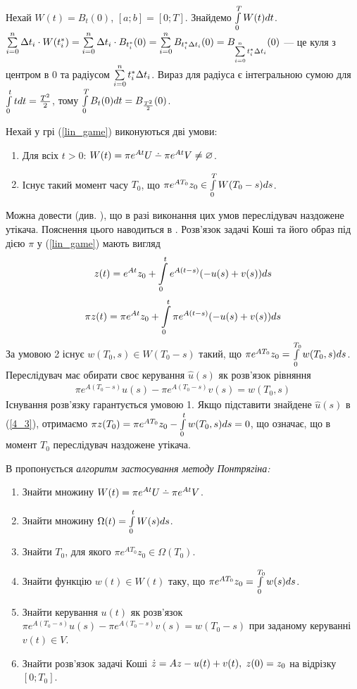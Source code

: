 \begin{example}\label{ball_intergral}
    Нехай $W(t) = B_t(0)$, $[a;b] = [0; T]$. Знайдемо 
    $\int\limits_0^T W(t) dt$.
    $\sum\limits_{i=0}^n \Delta t_i\cdot W(t_i^*) = \sum\limits_{i=0}^n \Delta t_i\cdot B_{t_i^*}(0) = 
    \sum\limits_{i=0}^n B_{t_i^* \Delta t_i}(0) = B_{\sum\limits_{i=0}^n t_i^* \Delta t_i} (0)$ --- це
    куля з центром в $0$ та радіусом $\sum\limits_{i=0}^n t_i^* \Delta t_i$. Вираз для радіуса
    є інтегральною сумою для $\int\limits_0^t t dt = \frac{T^2}{2}$, тому
    $\int\limits_0^T B_t(0) dt = B_{\frac{T^2}{2}} (0)$.
\end{example}
Нехай у грі (\ref{lin_game}) виконуються дві умови:
\begin{enumerate}
    \item Для всіх $t>0$: $W(t) = \pi e^{At}U \setdif \pi e^{At}V \neq \varnothing$.
    \item Існує такий момент часу $T_0$, що $\pi e^{AT_0}z_0 \in \int\limits_0^T W(T_0 - s)ds$.
\end{enumerate}

Можна довести (див. \cite{4}), що в разі виконання цих умов переслідувач наздожене утікача.
Пояснення цього наводиться в \cite{3}. Розв'язок задачі Коші та його образ під дією $\pi$ у (\ref{lin_game}) мають вигляд
\begin{gather}
    z(t) = e^{A t} z_0 + \int\limits_0^t e^{A(t-s)} (- u(s) + v(s)) ds
\end{gather}
\begin{gather}\label{4_3}
    \pi z(t) =  \pi e^{A t} z_0 + \int\limits_0^t \pi e^{A(t-s)} (- u(s) + v(s)) ds
\end{gather}
За умовою 2 існує $w(T_0, s) \in W(T_0-s)$ такий, що $\pi e^{AT_0}z_0 = \int\limits_0^{T_0} w(T_0, s) ds$. Переслідувач має обирати своє керування
$\widehat{u}(s)$ як розв'язок рівняння
\begin{gather*}
    \pi e^{A (T_0-s)} u(s) - \pi e^{A (T_0-s)} v(s) = w(T_0, s) 
\end{gather*}
Існування розв'язку гарантується умовою 1. Якщо підставити знайдене $\widehat{u}(s)$ в (\ref{4_3}),
отримаємо 
$
    \pi z(T_0) = \pi e^{A T_0} z_0 - \int\limits_0^t w(T_0, s) ds = 0
$, що означає, що в момент $T_0$ переслідувач наздожене утікача.

В \cite{3} пропонується \emph{алгоритм застосування методу Понтрягіна:}
\begin{enumerate}
    \item Знайти множину $W(t) = \pi e^{At}U \setdif \pi e^{At}V$.
    \item Знайти множину $\Omega(t) = \int\limits_0^t W(s)ds$.
    \item Знайти $T_0$, для якого $\pi e^{A T_0} z_0 \in \Omega(T_0)$.
    \item Знайти функцію $w(t) \in W(t)$ таку, що $\pi e^{A T_0} z_0 = \int\limits_0^{T_0} w(s) ds$.
    \item Знайти керування $u(t)$ як розв'язок $\pi e^{A (T_0-s)} u(s) - \pi e^{A (T_0-s)} v(s) = w(T_0 - s) $ при заданому керуванні $v(t) \in V$.
    \item Знайти розв'язок задачі Коші $\dot{z} = Az - u(t) + v(t), \; z(0) = z_0$ на відрізку $[0; T_0]$.
\end{enumerate}


